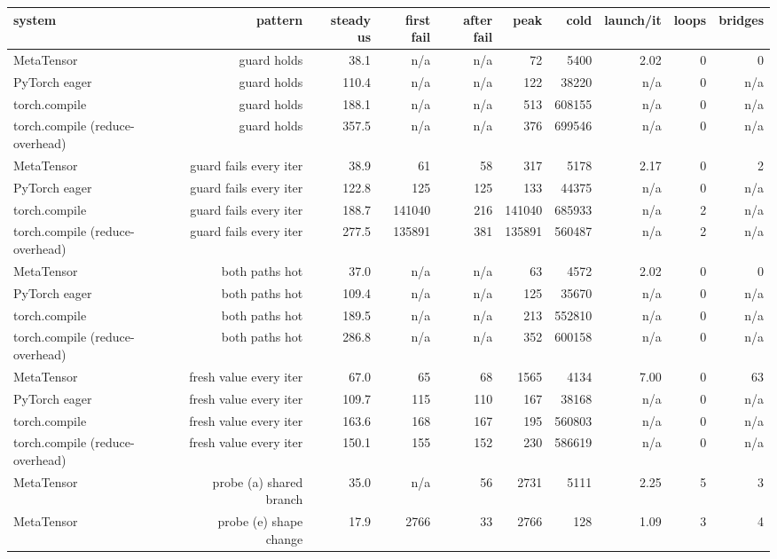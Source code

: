 \begin{tabular}{lrrrrrrrrr}
\toprule
system & pattern & steady us & first fail & after fail & peak & cold & launch/it & loops & bridges \\
\midrule
MetaTensor & guard holds & 38.1 & n/a & n/a & 72 & 5400 & 2.02 & 0 & 0 \\
PyTorch eager & guard holds & 110.4 & n/a & n/a & 122 & 38220 & n/a & 0 & n/a \\
torch.compile & guard holds & 188.1 & n/a & n/a & 513 & 608155 & n/a & 0 & n/a \\
torch.compile (reduce-overhead) & guard holds & 357.5 & n/a & n/a & 376 & 699546 & n/a & 0 & n/a \\
MetaTensor & guard fails every iter & 38.9 & 61 & 58 & 317 & 5178 & 2.17 & 0 & 2 \\
PyTorch eager & guard fails every iter & 122.8 & 125 & 125 & 133 & 44375 & n/a & 0 & n/a \\
torch.compile & guard fails every iter & 188.7 & 141040 & 216 & 141040 & 685933 & n/a & 2 & n/a \\
torch.compile (reduce-overhead) & guard fails every iter & 277.5 & 135891 & 381 & 135891 & 560487 & n/a & 2 & n/a \\
MetaTensor & both paths hot & 37.0 & n/a & n/a & 63 & 4572 & 2.02 & 0 & 0 \\
PyTorch eager & both paths hot & 109.4 & n/a & n/a & 125 & 35670 & n/a & 0 & n/a \\
torch.compile & both paths hot & 189.5 & n/a & n/a & 213 & 552810 & n/a & 0 & n/a \\
torch.compile (reduce-overhead) & both paths hot & 286.8 & n/a & n/a & 352 & 600158 & n/a & 0 & n/a \\
MetaTensor & fresh value every iter & 67.0 & 65 & 68 & 1565 & 4134 & 7.00 & 0 & 63 \\
PyTorch eager & fresh value every iter & 109.7 & 115 & 110 & 167 & 38168 & n/a & 0 & n/a \\
torch.compile & fresh value every iter & 163.6 & 168 & 167 & 195 & 560803 & n/a & 0 & n/a \\
torch.compile (reduce-overhead) & fresh value every iter & 150.1 & 155 & 152 & 230 & 586619 & n/a & 0 & n/a \\
MetaTensor & probe (a) shared branch & 35.0 & n/a & 56 & 2731 & 5111 & 2.25 & 5 & 3 \\
MetaTensor & probe (e) shape change & 17.9 & 2766 & 33 & 2766 & 128 & 1.09 & 3 & 4 \\
\bottomrule
\end{tabular}
